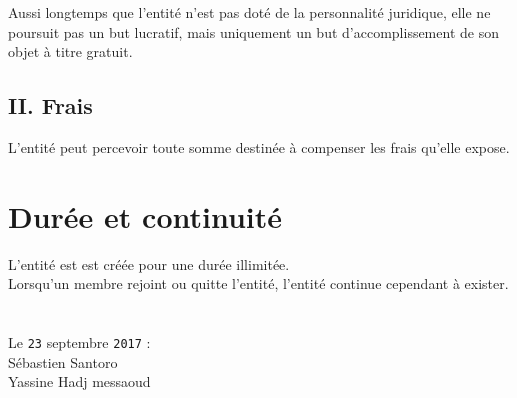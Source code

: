 \documentclass[10pt, a4paper]{article}
\begin{document}
Aussi longtemps que l'entité n'est pas doté de la personnalité juridique, elle ne poursuit pas un but lucratif, mais uniquement un but d'accomplissement de son objet à titre gratuit.

\subsection*{II. Frais}

L'entité peut percevoir toute somme destinée à compenser les frais qu'elle expose.

\section*{Durée et continuité}

L'entité est est créée pour une durée illimitée.\\

Lorsqu'un membre rejoint ou quitte l'entité, l'entité continue cependant à exister.

\vfill

\section*{}
Le \texttt{23} septembre \texttt{2017} :\\[0.2cm]
Sébastien Santoro\\[0.2cm]
Yassine Hadj messaoud
\end{document}
